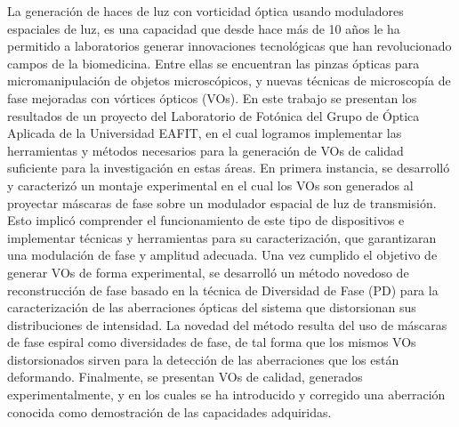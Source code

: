 




\begin{resumen}        %

La generación de haces de luz con vorticidad óptica usando moduladores
espaciales de luz, es una capacidad que desde hace 
más de 10 años le ha
permitido a laboratorios %
generar
innovaciones tecnológicas que han revolucionado campos de la
biomedicina. Entre ellas se encuentran las pinzas
ópticas para micromanipulación de objetos microscópicos, y nuevas
técnicas de microscopía de fase mejoradas con vórtices ópticos (VOs).  
En este trabajo se presentan los resultados de un proyecto del Laboratorio de Fotónica del Grupo de Óptica Aplicada de
la Universidad EAFIT, en el cual logramos implementar las herramientas y métodos
necesarios para la generación de VOs de calidad suficiente para la
investigación en estas áreas. 
En primera instancia, se desarrolló y caracterizó un montaje experimental
en el cual los VOs son generados al proyectar máscaras de
fase sobre un modulador espacial de luz de transmisión. Esto implicó
comprender el funcionamiento de este tipo de dispositivos e
implementar técnicas y herramientas para su caracterización, que garantizaran una
modulación de fase y amplitud adecuada. Una vez cumplido el objetivo de generar VOs
de forma experimental, se desarrolló un método novedoso de reconstrucción de fase basado en
la técnica de Diversidad de Fase (PD) para la caracterización de las
aberraciones ópticas del sistema que distorsionan sus distribuciones de intensidad. La
novedad del método resulta del uso de máscaras de fase espiral como
diversidades de fase, de tal forma que los mismos VOs distorsionados sirven
para la detección de las aberraciones que los están deformando. 
Finalmente, se presentan VOs de calidad, generados experimentalmente, y en los cuales
se ha introducido y corregido una aberración conocida como
demostración de las capacidades adquiridas.
\end{resumen}





